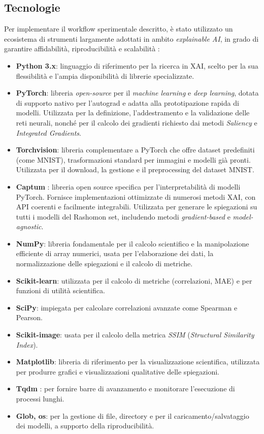 \documentclass{article}
\begin{document}
\subsection{Tecnologie}
Per implementare il workflow sperimentale descritto, è stato utilizzato un
ecosistema di strumenti largamente adottati in ambito \emph{explainable AI}, in
grado di garantire affidabilità, riproducibilità e scalabilità
\citep{adadi2018survey,mueller2023rashomon}:

\begin{itemize}
      \item \textbf{Python 3.x}: linguaggio di riferimento per la ricerca in XAI, scelto per la sua flessibilità e l’ampia disponibilità di librerie specializzate.
      \item \textbf{PyTorch}: libreria \emph{open-source} per il \emph{machine learning} e \emph{deep learning}, dotata di supporto nativo per l’autograd e adatta alla prototipazione rapida di modelli. Utilizzata per la definizione, l’addestramento e la validazione delle reti neurali, nonché per il calcolo dei gradienti richiesto dai metodi \emph{Saliency} e \emph{Integrated Gradients}.
      \item \textbf{Torchvision}: libreria complementare a PyTorch che offre dataset predefiniti (come MNIST), trasformazioni standard per immagini e modelli già pronti. Utilizzata per il download, la gestione e il preprocessing del dataset MNIST.
      \item \textbf{Captum} \citep{kokhlikyan2020captum}: libreria open source specifica per l’interpretabilità di modelli PyTorch. Fornisce implementazioni ottimizzate di numerosi metodi XAI, con API coerenti e facilmente integrabili. Utilizzata per generare le spiegazioni su tutti i modelli del Rashomon set, includendo metodi \emph{gradient-based} e \emph{model-agnostic}.
      \item \textbf{NumPy}: libreria fondamentale per il calcolo scientifico e la manipolazione efficiente di array numerici, usata per l’elaborazione dei dati, la normalizzazione delle spiegazioni e il calcolo di metriche.
      \item \textbf{Scikit-learn}: utilizzata per il calcolo di metriche (correlazioni, MAE) e per funzioni di utilità scientifica.
      \item \textbf{SciPy}: impiegata per calcolare correlazioni avanzate come Spearman e Pearson.
      \item \textbf{Scikit-image}: usata per il calcolo della metrica \emph{SSIM} (\emph{Structural Similarity Index}).
      \item \textbf{Matplotlib}: libreria di riferimento per la visualizzazione scientifica, utilizzata per produrre grafici e visualizzazioni qualitative delle spiegazioni.
      \item \textbf{Tqdm} \citep{tqdm}: per fornire barre di avanzamento e monitorare l’esecuzione di processi lunghi.
      \item \textbf{Glob, os}: per la gestione di file, directory e per il caricamento/salvataggio dei modelli, a supporto della riproducibilità.
\end{itemize}
\end{document}

